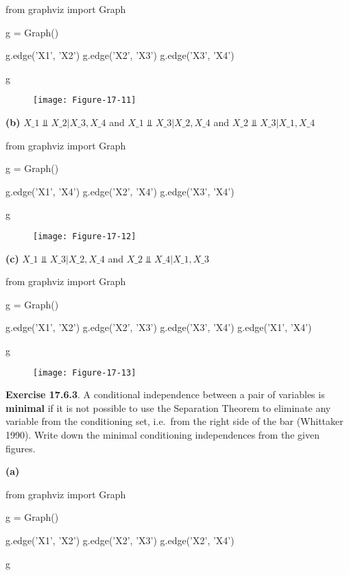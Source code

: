 \begin{python}
from graphviz import Graph

g = Graph()

g.edge('X1', 'X2')
g.edge('X2', 'X3')
g.edge('X3', 'X4')

g
\end{python}

\begin{figure}[H]
\centering
\texttt{[image: Figure-17-11]}
\end{figure}

\textbf{(b)} $X\_{1} \text{ ⫫ } X\_{2} |{} X\_{3}, X\_{4} $ and $X\_{1}
\text{ ⫫ } X\_{3} |{} X\_{2}, X\_{4} $ and $X\_{2} \text{ ⫫ } X\_{3}
|{} X\_{1}, X\_{4} $

\begin{python}
from graphviz import Graph

g = Graph()

g.edge('X1', 'X4')
g.edge('X2', 'X4')
g.edge('X3', 'X4')

g
\end{python}
 
\begin{figure}[H]
\centering
\texttt{[image: Figure-17-12]}
\end{figure}


\textbf{(c)} $X\_{1} \text{ ⫫ } X\_{3} |{} X\_{2}, X\_{4} $ and $X\_{2}
\text{ ⫫ } X\_{4} |{} X\_{1}, X\_{3} $

\begin{python}
from graphviz import Graph

g = Graph()

g.edge('X1', 'X2')
g.edge('X2', 'X3')
g.edge('X3', 'X4')
g.edge('X1', 'X4')

g
\end{python}

\begin{figure}[H]
\centering
\texttt{[image: Figure-17-13]}
\end{figure}

\textbf{Exercise 17.6.3}. A conditional independence between a pair of
variables is \textbf{minimal} if it is not possible to use the
Separation Theorem to eliminate any variable from the conditioning set,
i.e.~from the right side of the bar (Whittaker 1990). Write down the
minimal conditioning independences from the given figures.

\textbf{(a)}

\begin{python}
from graphviz import Graph

g = Graph()

g.edge('X1', 'X2')
g.edge('X2', 'X3')
g.edge('X2', 'X4')

g
\end{python}

